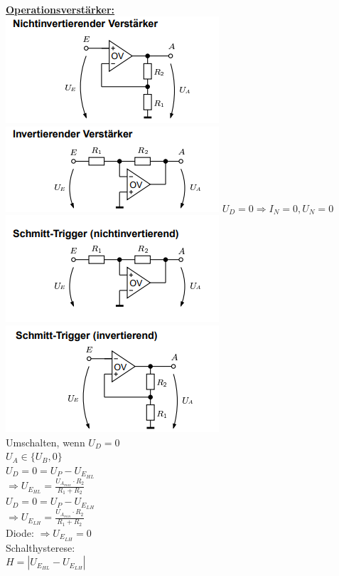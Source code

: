 \documentclass[11pt]{article}
\begin{document}
~~~~~~
\begin{minipage}{0.33\textwidth}
\underline{\textbf{Operationsverstärker:}}\\
\includegraphics[scale=0.40]{NIOV.png}
\includegraphics[scale=0.40]{IOV.png}
$U_D = 0 \Rightarrow I_N = 0, U_N = 0$\\

\includegraphics[scale=0.40]{NISTOV.png}\\
\includegraphics[scale=0.40]{ISTOV.png}\\
Umschalten, wenn $U_D = 0$\\
$U_A \in \{U_B,0\}$\\
$U_D = 0 = U_P - U_{E_{HL}}$\\
\phantom{sssi}$\Rightarrow U_{E_{HL}} = \frac{U_{A_{max}} \cdot R_2}{R_1 + R_2}$\\
$U_D = 0 = U_P - U_{E_{LH}}$\\
\phantom{sssi}$\Rightarrow U_{E_{LH}}= \frac{ U_{A_{min}} \cdot R_2}{R_1 + R_2}$\\
Diode: $\Rightarrow U_{E_{LH}} = 0$\\
Schalthysterese:\\
\phantom{sssssi} $H = |U_{E_{HL}} - U_{E_{LH}}|$\\


\end{minipage}
\end{document}
